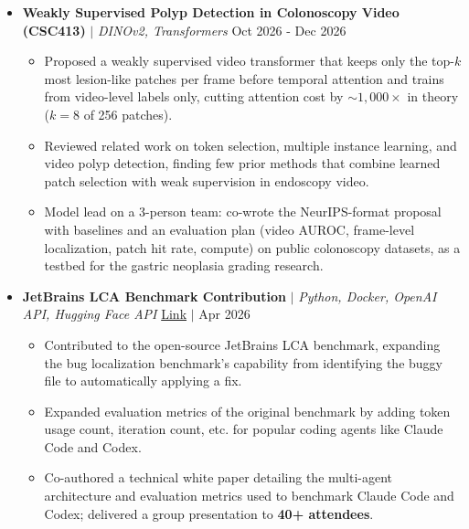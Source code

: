 \documentclass{article}
\begin{document}
\begin{itemize}
\item[] \textbf{Weakly Supervised Polyp Detection in Colonoscopy Video (CSC413)} $\mid$ \textit{DINOv2, Transformers} \hfill Oct 2026 - Dec 2026
  \begin{itemize}
    \item Proposed a weakly supervised video transformer that keeps only the top-$k$ most lesion-like patches per frame before temporal attention and trains from video-level labels only, cutting attention cost by ${\sim}1{,}000\times$ in theory ($k=8$ of 256 patches).
    \item Reviewed related work on token selection, multiple instance learning, and video polyp detection, finding few prior methods that combine learned patch selection with weak supervision in endoscopy video.
    \item Model lead on a 3-person team: co-wrote the NeurIPS-format proposal with baselines and an evaluation plan (video AUROC, frame-level localization, patch hit rate, compute) on public colonoscopy datasets, as a testbed for the gastric neoplasia grading research.
  \end{itemize}
  \vspace{3px}

\item[] \textbf{JetBrains LCA Benchmark Contribution} $\mid$ \textit{Python, Docker, OpenAI API, Hugging Face API} \hfill \href{https://github.com/CSC392-CSC492-Building-AI-ML-systems/JetBrains-LCA-Winter2026}{Link} $\mid$ Apr 2026
  \begin{itemize}
    \item Contributed to the open-source JetBrains LCA benchmark, expanding the bug localization benchmark's capability from identifying the buggy file to automatically applying a fix.
    \item Expanded evaluation metrics of the original benchmark by adding token usage count, iteration count, etc. for popular coding agents like Claude Code and Codex.
    \item Co-authored a technical white paper detailing the multi-agent architecture and evaluation metrics used to benchmark Claude Code and Codex; delivered a group presentation to \textbf{40+ attendees}.
  \end{itemize}

\end{itemize}
\end{document}
